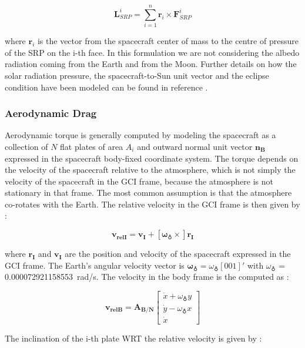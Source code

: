 \documentclass[11pt,a4paper]{report}
\begin{document}
\begin{equation}
    \mathbf{L}_{SRP}^{i} = \sum\limits_{i=1}^n  \mathbf{r}_{i} \times \mathbf{F}_{SRP}^{i} 
\end{equation}

where $\mathbf{r}_{i}$ is the vector from the spacecraft center of mass to the centre of pressure of the SRP on the i-th face.
In this formulation we are not considering the albedo radiation coming from the Earth and from the Moon.
Further details on how the solar radiation pressure, the spacecraft-to-Sun unit vector and the eclipse condition have been modeled can be found in reference \cite{Ref:Books:Fundamentals}.

\subsubsection{Aerodynamic Drag}
Aerodynamic torque is generally computed by modeling the spacecraft as a collection of $N$ flat plates of area $A_i$ and outward normal unit vector $\mathbf{n_{B}}$ expressed in the spacecraft body-fixed coordinate system. The torque depends on the velocity of the spacecraft relative to the atmosphere, which is not simply the velocity of the spacecraft in the GCI frame, because the atmosphere is not stationary in that frame.
The most common assumption is that the atmosphere co-rotates with the Earth. The relative velocity in the GCI frame is then given by : 

\begin{equation}
 \mathbf{v_{relI}} =  \mathbf{v_I} + [\mathbf{\omega_{\earth} \times}] \mathbf{r_I}
\end{equation}

where $\mathbf{r_I}$ and $\mathbf{v_I}$ are the position and velocity of the spacecraft expressed in the GCI frame. 
The Earth’s angular velocity vector is $\mathbf{\omega_{\earth}} = \omega_{\earth}[0 0 1]'$ with $\omega_{\earth}$ = \SI{0.000072921158553}{\radian/\second}.
The velocity in the body frame is the computed as : 

\begin{equation}
 \mathbf{v_{relB}} = \mathbf{A_{B/N}}   \begin{bmatrix} \dot{x} + \omega_{\earth} y \\ \dot{y} - \omega_{\earth} x \\ \dot{x} \end{bmatrix}
\end{equation}

The inclination of the i-th plate WRT the relative velocity is given by : 
\end{document}
